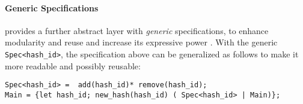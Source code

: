 \paragraph{Generic Specifications}
\rml provides a further abstract layer with \emph{generic} specifications,
to enhance modularity and reuse and increase its expressive power \cite{RML2021}.
With the generic \lstinline{Spec<hash_id>}, the specification above
can be generalized as follows to make it more readable and possibly reusable:
\begin{lstlisting}[basicstyle=\ttfamily\scriptsize]
Spec<hash_id> =  add(hash_id)* remove(hash_id); 
Main = {let hash_id; new_hash(hash_id) ( Spec<hash_id> | Main)};
\end{lstlisting}

